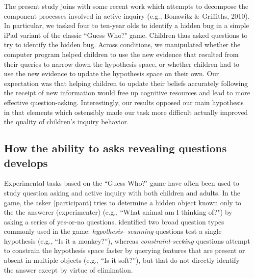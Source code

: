 \documentclass[10pt,letterpaper]{article}
\begin{document}
\nocite{Bonawitz:2010pb}
The present study joins with some recent work which attempts to decompose the 
component processes involved in active inquiry (e.g., Bonawitz \& Griffiths, 2010).  
In particular, we tasked four to ten-year olds to identify a hidden bug in
a simple iPad variant of the classic ``Guess Who?" game. Children thus asked questions to try 
to identify the hidden bug. Across conditions, we manipulated whether the computer program 
helped children to use the new evidence that resulted from their queries to narrow down the
hypothesis space, or whether children had to use the new evidence to update the hypothesis space
on their own.  Our expectation was that helping children to update their beliefs accurately following the 
receipt of new information would free up cognitive resources and lead to more effective question-asking. 
Interestingly, our results opposed our main hypothesis in that elements which 
ostensibly made our task more difficult actually improved the quality of children's inquiry 
behavior.  

\subsection{How the ability to asks revealing questions develops}

Experimental tasks based on the ``Guess Who?" game have often been used to
study question asking and active inquiry with both children and adults.
In the game, the asker (participant) tries to determine a hidden object known
only to the the answerer (experimenter) (e.g., ``What animal am I thinking of?")
by asking a series of yes-or-no questions.
 identified two broad question types commonly used in the game: \emph{hypothesis-
scanning} questions test a single hypothesis (e.g., ``Is it a monkey?''), whereas 
\emph{constraint-seeking} questions attempt to constrain the hypothesis space faster by 
querying features that are present or absent in multiple objects (e.g., ``Is it soft?''), 
but that do not directly identify the answer except by virtue of elimination. 
\end{document}
